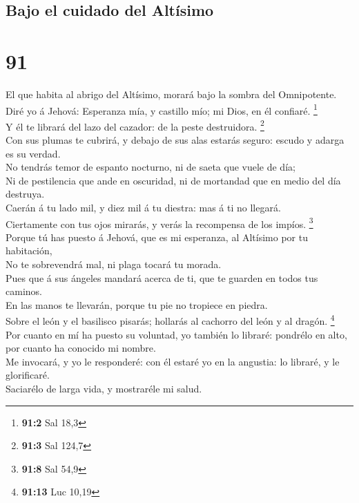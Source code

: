 \hypertarget{bajo-el-cuidado-del-altuxedsimo}{%
\subsection{Bajo el cuidado del
Altísimo}\label{bajo-el-cuidado-del-altuxedsimo}}

\hypertarget{section-90}{%
\section{91}\label{section-90}}

 El que habita al abrigo del Altísimo, morará bajo la
sombra del Omnipotente.\\
 Diré yo á Jehová: Esperanza mía, y castillo mío; mi Dios,
en él confiaré. \footnote{\textbf{91:2} Sal 18,3}\\
 Y él te librará del lazo del cazador: de la peste
destruidora. \footnote{\textbf{91:3} Sal 124,7}\\
 Con sus plumas te cubrirá, y debajo de sus alas estarás
seguro: escudo y adarga es su verdad.\\
 No tendrás temor de espanto nocturno, ni de saeta que
vuele de día;\\
 Ni de pestilencia que ande en oscuridad, ni de mortandad
que en medio del día destruya.\\
 Caerán á tu lado mil, y diez mil á tu diestra: mas á ti
no llegará.\\
 Ciertamente con tus ojos mirarás, y verás la recompensa
de los impíos. \footnote{\textbf{91:8} Sal 54,9}\\
 Porque tú has puesto á Jehová, que es mi esperanza, al
Altísimo por tu habitación,\\
 No te sobrevendrá mal, ni plaga tocará tu morada.\\
 Pues que á sus ángeles mandará acerca de ti, que te
guarden en todos tus caminos.\\
 En las manos te llevarán, porque tu pie no tropiece en
piedra.\\
 Sobre el león y el basilisco pisarás; hollarás al
cachorro del león y al dragón. \footnote{\textbf{91:13} Luc 10,19}\\
 Por cuanto en mí ha puesto su voluntad, yo también lo
libraré: pondrélo en alto, por cuanto ha conocido mi nombre.\\
 Me invocará, y yo le responderé: con él estaré yo en la
angustia: lo libraré, y le glorificaré.\\
 Saciarélo de larga vida, y mostraréle mi salud.

